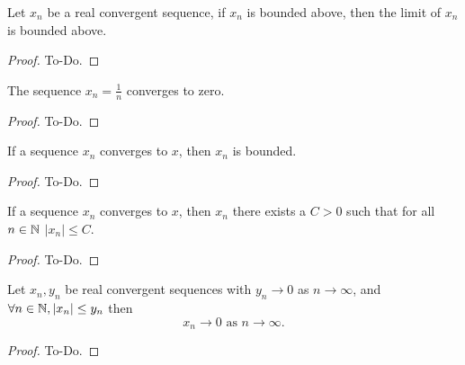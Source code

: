 \begin{lemma}\label{lem:seqboundabove_limboundabove}
     \leanok
    Let $x_n$ be a real convergent sequence,
    if $x_n$ is bounded above,
    then the limit of $x_n$ is bounded above.
\end{lemma}
\begin{proof}
    To-Do.
\end{proof}

\begin{theorem}\label{thm:seq_harmonic_conv}
     \leanok
    The sequence $x_n = \frac{1}{n}$ converges to zero.
\end{theorem}
\begin{proof}
    To-Do.
\end{proof}

\begin{theorem}\label{thm:seq_conv_bound}
     \leanok
    If a sequence $x_n$ converges to $x$,
    then $x_n$ is bounded.
\end{theorem}
\begin{proof}
    To-Do.
\end{proof}

\begin{corollary}\label{cor:seq_conv_abs_bound}
     \leanok
    If a sequence $x_n$ converges to $x$,
    then $x_n$ there exists a $C > 0$ such that for all $n \in \mathbb{N}$ $|x_n| \leq C$.
\end{corollary}
\begin{proof}
    To-Do.
\end{proof}

\begin{theorem}\label{thm:squeeze_zero}
     \leanok
    Let $x_n, y_n$ be real convergent sequences with $y_n \to 0$ as $n \to \infty$,
    and $\forall n \in \mathbb{N}, |x_n| \leq y_n$ then
    \[
    x_n \to 0 \text{ as } n \to \infty.
    \]
\end{theorem}
\begin{proof}
    To-Do.
\end{proof}

